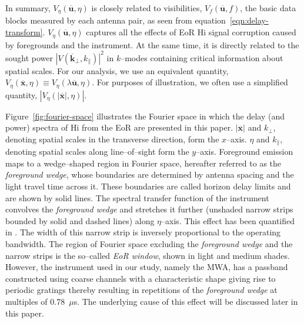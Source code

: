 \documentclass[preprint2,iop,numberedappendix]{emulateapj}
\begin{document}
In summary, $V_\eta(\overline{\mathbf{u}},\eta)$ is closely related to visibilities, $V_f(\overline{\mathbf{u}},f)$, the basic data blocks measured by each antenna pair, as seen from equation~\ref{eqn:delay-transform}. $V_\eta(\overline{\mathbf{u}},\eta)$ captures all the effects of EoR H{\sc i} signal corruption caused by foregrounds and the instrument. At the same time, it is directly related to the sought power $|V(\overline{\mathbf{k}}_\perp,k_\parallel)|^2$ in $k$--modes containing critical information about spatial scales. For our analysis, we use an equivalent quantity, $V_\eta(\overline{\mathbf{x}},\eta) \equiv V_\eta(\lambda\overline{\mathbf{u}},\eta)$. For purposes of illustration, we often use a simplified quantity, $|V_\eta(|\overline{\mathbf{x}}|,\eta)|$.

Figure~\ref{fig:fourier-space} illustrates the Fourier space in which the delay (and power) spectra of H{\sc i} from the EoR are presented in this paper. $|\overline{\mathbf{x}}|$ and $k_\perp$, denoting spatial scales in the transverse direction, form the $x$--axis. $\eta$ and $k_\parallel$, denoting spatial scales along line--of--sight form the $y$--axis. Foreground emission maps to a wedge--shaped region in Fourier space, hereafter referred to as the {\it foreground wedge}, whose boundaries are determined by antenna spacing and the light travel time across it. These boundaries are called horizon delay limits and are shown by solid lines. The spectral transfer function of the instrument convolves the {\it foreground wedge} and stretches it further (unshaded narrow strips bounded by solid and dashed lines) along $\eta$--axis. This effect has been quantified in \citet{thy13}. The width of this narrow strip is inversely proportional to the operating bandwidth. The region of Fourier space excluding the {\it foreground wedge} and the narrow strips is the so--called {\it EoR window}, shown in light and medium shades. However, the instrument used in our study, namely the MWA, has a passband constructed using coarse channels with a characteristic shape giving rise to periodic gratings thereby resulting in repetitions of the {\it foreground wedge} at multiples of 0.78~$\mu$s. The underlying cause of this effect will be discussed later in this paper. 

\end{document}
